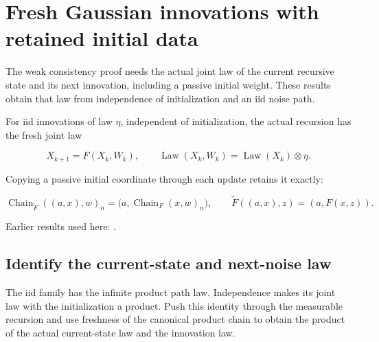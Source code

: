 \documentclass[11pt,a4paper]{report}
\begin{document}
\section{\texorpdfstring{Fresh Gaussian innovations with retained initial data}{Fresh Gaussian innovations with retained initial data}}
\label{proof-module-AverageLMC-LaplacianIndependentSteps-lean}


The weak consistency proof needs the actual joint law of the current recursive state and its next innovation, including a passive initial weight. These results obtain that law from independence of initialization and an iid noise path.



For iid innovations of law \(\eta\), independent of initialization, the actual recursion has the fresh joint law


\[X_{k+1}=F(X_k,W_k),\qquad
\operatorname{Law}(X_k,W_k)=\operatorname{Law}(X_k)\otimes\eta.\]


Copying a passive initial coordinate through each update retains it exactly:


\[\operatorname{Chain}_{\widetilde F}((a,x),w)_n
=\bigl(a,\operatorname{Chain}_F(x,w)_n\bigr),\qquad
\widetilde F((a,x),z)=(a,F(x,z)).\]

Earlier results used here: \cite[Section~3.33]{LangevinLean2026ULASC}.
\subsection{\texorpdfstring{Identify the current-state and next-noise law}{Identify the current-state and next-noise law}}
\label{report-step-AverageLMC-LaplacianIndependentSteps-lean-1}


The iid family has the infinite product path law. Independence makes its joint law with the initialization a product. Push this identity through the measurable recursion and use freshness of the canonical product chain to obtain the product of the actual current-state law and the innovation law.
\end{document}
